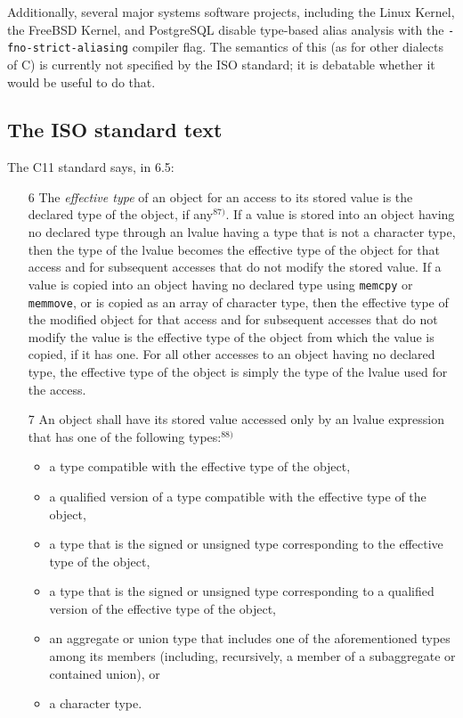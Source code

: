 \documentclass[12pt,acmsmall,review,screen]{acmart}\settopmatter{printfolios=true,printccs=false,printacmref=false}
\begin{document}
Additionally, several major systems software projects, including the Linux Kernel,
the FreeBSD Kernel, and PostgreSQL disable type-based alias analysis
with the \lstinline{-fno-strict-aliasing} compiler flag.  The
semantics of this (as for other dialects of C) is currently not
specified by the ISO standard; it is debatable whether it would be
useful to do that. 



\subsection{The ISO standard text}
                                   
The C11 standard says, in 6.5:

\begin{itemize}
\item[6] The \emph{effective type} of an object for an access to
  its stored value is the declared type of the object, if any${}^{\text{87)}}$. If a
value is stored into an object having no declared type through an
lvalue having a type that is not a character type, then the type of
the lvalue becomes the effective type of the object for that access
and for subsequent accesses that do not modify the stored value. If
a value is copied into an object having no declared type using
\lstinline{memcpy} or \lstinline{memmove}, or is copied as an array of
character type, then the effective type of the modified object for
that access and for subsequent accesses that do not modify the value
is the effective type of the object from which the value is copied,
if it has one. For all other accesses to an object having no
declared type, the effective type of the object is simply the type
of the lvalue used for the access.

\item[7] An object shall have its stored value accessed only by an lvalue
expression that has one of the following types:${}^\text{88)}$
\begin{itemize}    
  \item  a type compatible with the effective type of the object,
  \item  a qualified version of a type compatible with the effective type
    of the object,
  \item  a type that is the signed or unsigned type corresponding to the
    effective type of the object,
  \item  a type that is the signed or unsigned type corresponding to a
    qualified version of the effective type of the object,
  \item  an aggregate or union type that includes one of the
    aforementioned types among its members (including, recursively, a
    member of a subaggregate or contained union), or
  \item  a character type.
\end{itemize}
\end{itemize}
\end{document}
